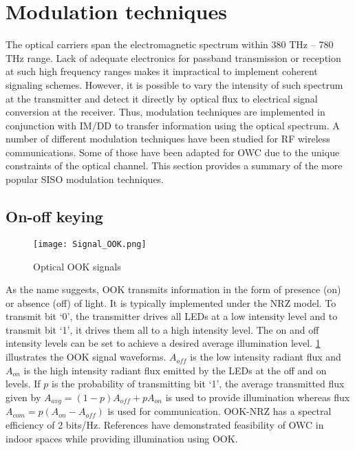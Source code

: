 \section{Modulation techniques}
\label{sec:sisoModulation}
\graphicspath{{_SISO/Figures/}}

The optical carriers span the electromagnetic spectrum within 380 THz -- 780 THz range. Lack of adequate electronics for passband transmission or reception at such high frequency ranges makes it impractical to implement coherent signaling schemes. However, it is possible to vary the intensity of such spectrum at the transmitter and detect it directly by optical flux to electrical signal conversion at the receiver. Thus, modulation techniques are implemented in conjunction with IM/DD to transfer information using the optical spectrum. A number of different modulation techniques have been studied for RF wireless communications. Some of those have been adapted for OWC due to the unique constraints of the optical channel. This section provides a summary of the more popular SISO modulation techniques.

\subsection{On-off keying}
\label{subsec:sisoModulationOOK}
\begin{figure}[!b]
	\centering
		\texttt{[image: Signal\_OOK.png]}
		\caption{Optical OOK signals}
		\label{fig:sisoSigOOK}
\end{figure}
As the name suggests, OOK transmits information in the form of presence (on) or absence (off) of light. It is typically implemented under the NRZ model. To transmit bit `0', the transmitter drives all LEDs at a low intensity level and to transmit bit `1', it drives them all to a high intensity level. The on and off intensity levels can be set to achieve a desired average illumination level. \figurename{ \ref{fig:sisoSigOOK}} illustrates the OOK signal waveforms. $A_{off}$ is the low intensity radiant flux and $A_{on}$ is the high intensity radiant flux emitted by the LEDs at the off and on levels. If $p$ is the probability of transmitting bit `1', the average transmitted flux given by $A_{avg} = (1-p)A_{off} + pA_{on}$ is used to provide illumination whereas flux $A_{com} = p(A_{on}-A_{off})$ is used for communication. OOK-NRZ has a spectral efficiency of 2 bits/Hz. References \cite{kom04a,vuc09b} have demonstrated feasibility of OWC in indoor spaces while providing illumination using OOK.


